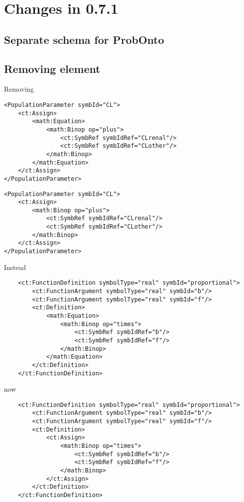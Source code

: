 
\chapter{Changes in 0.7.1}


\section{Separate schema for ProbOnto}

\section{Removing  element}

Removing

\lstset{language=XML}
\begin{lstlisting}
<PopulationParameter symbId="CL">
    <ct:Assign>
        <math:Equation>
            <math:Binop op="plus">
                <ct:SymbRef symbIdRef="CLrenal"/>
                <ct:SymbRef symbIdRef="CLother"/>
            </math:Binop>
        </math:Equation>
    </ct:Assign>
</PopulationParameter>
\end{lstlisting}

\lstset{language=XML}
\begin{lstlisting}
<PopulationParameter symbId="CL">
    <ct:Assign>
        <math:Binop op="plus">
            <ct:SymbRef symbIdRef="CLrenal"/>
            <ct:SymbRef symbIdRef="CLother"/>
        </math:Binop>
    </ct:Assign>
</PopulationParameter>
\end{lstlisting}

Instead
\lstset{language=XML}
\begin{lstlisting}
    <ct:FunctionDefinition symbolType="real" symbId="proportional">
        <ct:FunctionArgument symbolType="real" symbId="b"/>
        <ct:FunctionArgument symbolType="real" symbId="f"/>
        <ct:Definition>
            <math:Equation>
                <math:Binop op="times">
                    <ct:SymbRef symbIdRef="b"/>
                    <ct:SymbRef symbIdRef="f"/>
                </math:Binop>
            </math:Equation>
        </ct:Definition>
    </ct:FunctionDefinition>
\end{lstlisting}
now
\lstset{language=XML}
\begin{lstlisting}
    <ct:FunctionDefinition symbolType="real" symbId="proportional">
        <ct:FunctionArgument symbolType="real" symbId="b"/>
        <ct:FunctionArgument symbolType="real" symbId="f"/>
        <ct:Definition>
            <ct:Assign>
                <math:Binop op="times">
                    <ct:SymbRef symbIdRef="b"/>
                    <ct:SymbRef symbIdRef="f"/>
                </math:Binop>
            </ct:Assign>
        </ct:Definition>
    </ct:FunctionDefinition>
\end{lstlisting}


